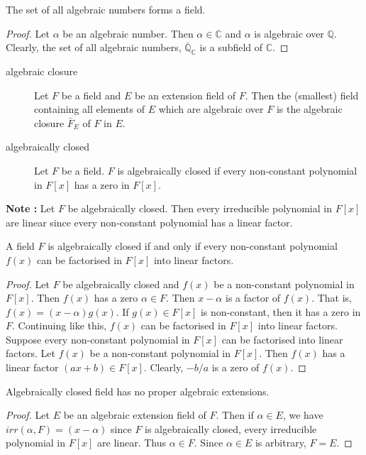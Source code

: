 \begin{corollary}
	The set of all algebraic numbers forms a field.
\end{corollary}
\begin{proof}
	Let $\alpha$ be an algebraic number.
	Then $\alpha \in \mathbb{C}$ and $\alpha$ is algebraic over $\mathbb{Q}$.
	Clearly, the set of all algebraic numbers, $\bar{\mathbb{Q}}_\mathbb{C}$ is a subfield of $\mathbb{C}$.
\end{proof}

\begin{description}
	\item[algebraic closure] Let $F$ be a field and $E$ be an extension field of $F$.
		Then the (smallest) field containing all elements of $E$ which are algebraic over $F$ is the algebraic closure $\bar{F}_E$ of $F$ in $E$.
	\item[algebraically closed] Let $F$ be a field.
		$F$ is algebraically closed if every non-constant polynomial in $F[x]$ has a zero in $F[x]$.
		
\end{description}

\textbf{Note : } Let $F$ be algebraically closed.
Then every irreducible polynomial in $F[x]$ are linear since every non-constant polynomial has a linear factor.

\begin{theorem}
	A field $F$ is algebraically closed if and only if every non-constant polynomial $f(x)$ can be factorised in $F[x]$ into linear factors.
\end{theorem}
\begin{proof}
	Let $F$ be algebraically closed and $f(x)$ be a non-constant polynomial in $F[x]$.
	Then $f(x)$ has a zero $\alpha \in F$.
	Then $x-\alpha$ is a factor of $f(x)$.
	That is, $f(x) = (x-\alpha)g(x)$.
	If $g(x) \in F[x]$ is non-constant, then it has a zero in $F$.
	Continuing like this, $f(x)$ can be factorised in $F[x]$ into linear factors.\\

	Suppose every non-constant polynomial in $F[x]$ can be factorised into linear factors.
	Let $f(x)$ be a non-constant polynomial in $F[x]$.
	Then $f(x)$ has a linear factor $(ax+b) \in F[x]$.
	Clearly, $-b/a$ is a zero of $f(x)$.
\end{proof}

\begin{theorem}
	Algebraically closed field has no proper algebraic extensions.
\end{theorem}
\begin{proof}
	Let $E$ be an algebraic extension field of $F$.
	Then if $\alpha \in E$, we have $irr(\alpha,F) = (x-\alpha)$ since $F$ is algebraically closed, every irreducible polynomial in $F[x]$ are linear.
	Thus $\alpha \in F$.
	Since $\alpha \in E$ is arbitrary, $F = E$.
\end{proof}

